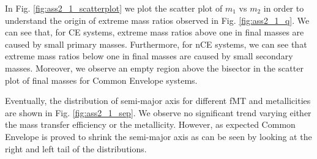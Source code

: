 \documentclass[prb,twocolumn,9pt]{revtex4-1}
\begin{document}
In Fig. \ref{fig:ass2_1_scatterplot} we plot the scatter plot of \(m_1\) vs \(m_2\) in order to understand the origin of extreme mass ratios observed in Fig. \ref{fig:ass2_1_q}. We can see that, for CE systems, extreme mass ratios above one in final masses are caused by small primary masses.  Furthermore, for nCE systems, we can see that extreme mass ratios below one in final masses are caused by small secondary masses. Moreover, we observe an empty region above the bisector in the scatter plot of final masses for Common Envelope systems. 

Eventually, the distribution of semi-major axis for different fMT and metallicities are shown in Fig. \ref{fig:ass2_1_sep}. We observe no significant trend varying either the mass transfer efficiency or the metallicity. However, as expected Common Envelope is proved to shrink the semi-major axis as can be seen by looking at the right and left tail of the distributions. 
\end{document}
